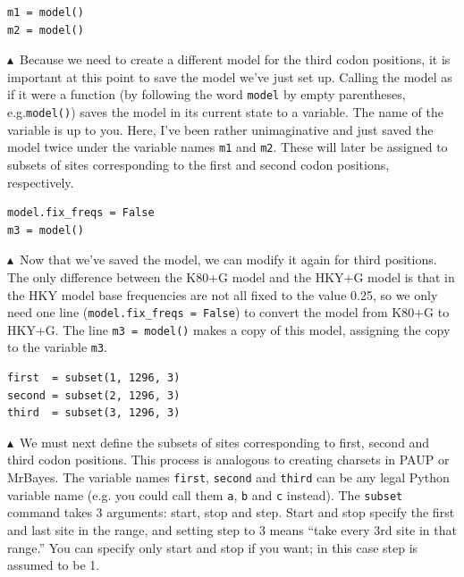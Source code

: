 \documentclass[10pt]{article}
\newcommand{\code}[1]{{\tt #1}}					%
\newcommand{\cmd}[1]{{\tt \small #1}\index{#1}}	%
\newcommand{\pointup}{$\blacktriangle$}
\begin{document}
\begin{samepage}
\begin{verbatim}
m1 = model()
m2 = model()
\end{verbatim}
\pointup\ Because we need to create a different model for the third codon positions, it is important at this point to save the model we've just set up. Calling the model as if it were a function (by following the word \code{model} by empty parentheses, e.g.\code{model()}) saves the model in its current state to a variable. The name of the variable is up to you. Here, I've been rather unimaginative and just saved the model twice under the variable names \code{m1} and \code{m2}. These will later be assigned to subsets of sites corresponding to the first and second codon positions, respectively.
\end{samepage}

\begin{samepage}
\begin{verbatim}
model.fix_freqs = False
m3 = model()
\end{verbatim}
\pointup\ Now that we've saved the model, we can modify it again for third positions. The only difference between the K80+G model and the HKY+G model is that in the HKY model base frequencies are not all fixed to the value 0.25, so we only need one line (\code{model.fix\_freqs = False}) to convert the model from K80+G to HKY+G. The line \code{m3 = model()} makes a copy of this model, assigning the copy to the variable \code{m3}.
\end{samepage}

\begin{samepage}
\begin{verbatim}
first  = subset(1, 1296, 3)
second = subset(2, 1296, 3)
third  = subset(3, 1296, 3)
\end{verbatim}
\pointup\ We must next define the subsets of sites corresponding to first, second and third codon positions. This process is analogous to creating charsets in PAUP or MrBayes. The variable names \code{first}, \code{second} and \code{third} can be any legal Python variable name (e.g. you could call them \code{a}, \code{b} and \code{c} instead). The \cmd{subset} command takes 3 arguments: start, stop and step. Start and stop specify the first and last site in the range, and setting step to 3 means ``take every 3rd site in that range.'' You can specify only start and stop if you want; in this case step is assumed to be 1.
\end{samepage}
\end{document}
